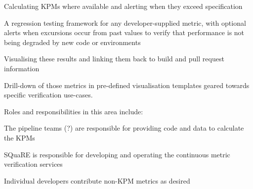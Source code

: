 \begin{itemize_single}

\item Calculating KPMs where available and alerting when they exceed specification
  
\item A regression testing framework for any developer-supplied metric, with optional alerts when excursions occur from past values to verify that performance is not being degraded by new code or environments

\item Visualising these results and linking them back to build and pull request information

\item  Drill-down of those metrics in pre-defined visualisation templates geared towards specific verification use-cases.

Roles and responsibilities in this area include:
 
\item The pipeline teams (?) are responsible for providing code and data to calculate the KPMs
  
\item SQuaRE is responsible for developing and operating the continuous metric verification services

\item Individual developers contribute non-KPM metrics as desired

\end{itemize_single}